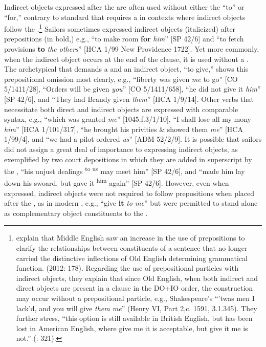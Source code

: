 Indirect objects expressed after the  are often used without either the  “to” or “for,” contrary to standard  that requires a  in contexts where indirect objects follow the .\footnote{\citeauthor{MillwardHayes2012} explain that Middle English saw an increase in the use of prepositions to clarify the relationships between constituents of a sentence that no longer carried the distinctive inflections of Old English determining grammatical function. (2012: 178). Regarding the use of prepositional particles with indirect objects, they explain that since Old English, when both indirect and direct objects are present in a clause in the DO+IO order, the construction may occur without a prepositional particle, e.g., Shakespeare’s “’twas men I lack’d, and you will give \textit{them me}” (Henry VI, Part 2,c. 1591, 3.1.345). They further stress, “this option is still available in British English, but has been lost in American English, where give me it is acceptable, but give it me is not.” (\citealt{MillwardHayes2012}: 321).} Sailors sometimes expressed indirect objects (italicized) after prepositions (in bold,) e.g., “to make room \textbf{for} \textit{him}” [SP 42/6] and “to fetch provisions \textbf{to} \textit{the others}” [HCA 1/99 New Providence 1722]. Yet more commonly, when the indirect object occurs at the end of the clause, it is used without a . The archetypical  that demands a  and an indirect object, “to give,” shows this prepositional omission most clearly, e.g., “liberty was given \textit{me} to go” [CO 5/1411/28], “Orders will be given \textit{you}” [CO 5/1411/658], “he did not give it \textit{him}” [SP 42/6], and “They had Brandy given \textit{them}” [HCA 1/9/14]. Other verbs that necessitate both direct and indirect objects are expressed with comparable syntax, e.g., “which was granted \textit{me}” [1045.f.3/1/10], “I shall lose all my mony \textit{him}” [HCA 1/101/317], “he brought his privities \& showed them \textit{me}” [HCA 1/99/4], and “we had a pilot ordered \textit{us}” [ADM 52/2/9]. It is possible that sailors did not assign a great deal of importance to expressing indirect objects, as exemplified by two court depositions in which they are added in superscript by the , “his unjust dealings \textsuperscript{to us} may meet him” [SP 42/6], and “made him lay down his swoard, but gave it \textsuperscript{him} again” [SP 42/6]. However, even when expressed, indirect objects were not required to follow prepositions when placed after the , as in modern , e.g., “give \textbf{it} \textit{to me}” but were permitted to stand alone as complementary object constituents to the . 

